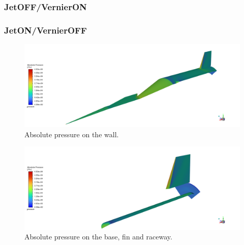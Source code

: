 \documentclass[12pt]{article}
\begin{document}
\subsubsection{JetOFF/VernierON}

\subsubsection{JetON/VernierOFF}

\begin{figure}[H]
    \centering
    \includegraphics[width=\linewidth]{figs/t72s/Pabs_wall.png}
    \caption{Absolute pressure on the wall.}
    \label{fig:t72s_wall_pabs}
\end{figure}
\begin{figure}[H]
    \centering
    \includegraphics[width=\linewidth]{figs/t72s/Pabs_base_fin_raceway.png}
    \caption{Absolute pressure on the base, fin and raceway.}
    \label{fig:t72s_base_fin_raceway_pabs}
\end{figure}
\end{document}
